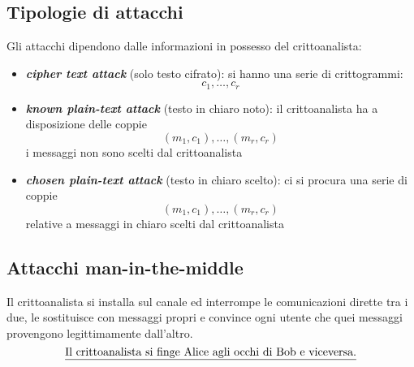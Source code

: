\subsection{Tipologie di attacchi}
Gli attacchi dipendono dalle informazioni in possesso del crittoanalista:
\begin{itemize}
    \item \textbf{\emph{cipher text attack}} (solo testo cifrato): si hanno una serie di crittogrammi:
    \[c_{1}, \dots , c_{r}\]
    \item \textbf{\emph{known plain-text attack}} (testo in chiaro noto): il crittoanalista ha a disposizione delle coppie
    $$(m_{1}, c_{1}), \dots , (m_{r}, c_{r})$$
    i messaggi non sono scelti dal crittoanalista
    \item \textbf{\emph{chosen plain-text attack}} (testo in chiaro scelto): ci si procura una serie di coppie
    $$(m_{1}, c_{1}), \dots , (m_{r}, c_{r})$$
    relative a messaggi in chiaro scelti dal crittoanalista
\end{itemize}

\subsection{Attacchi man-in-the-middle}
Il crittoanalista si installa sul canale ed interrompe le comunicazioni dirette tra i due, le sostituisce con messaggi propri e convince ogni utente che quei messaggi provengono legittimamente dall'altro.
\[\text{\underline{Il crittoanalista si finge Alice agli occhi di Bob e viceversa.}}\]

